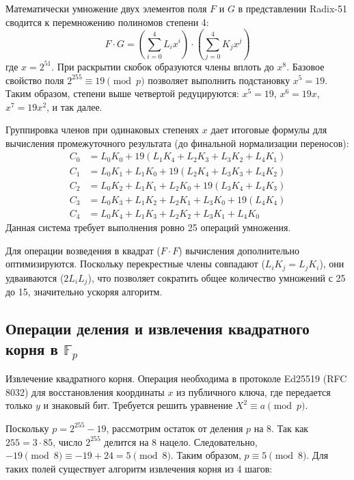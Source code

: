 Математически умножение двух элементов поля $F$ и $G$ в представлении Radix-51 сводится к перемножению полиномов степени 4:
\begin{equation}
    F \cdot G = \left( \sum_{i=0}^{4} L_i x^i \right) \cdot \left( \sum_{j=0}^{4} K_j x^j \right)
\end{equation}
где $x = 2^{51}$. При раскрытии скобок образуются члены вплоть до $x^8$. Базовое свойство поля $2^{255} \equiv 19 \pmod p$ позволяет выполнить подстановку $x^5 = 19$. Таким образом, степени выше четвертой редуцируются: $x^5 = 19$, $x^6 = 19x$, $x^7 = 19x^2$, и так далее. 

Группировка членов при одинаковых степенях $x$ дает итоговые формулы для вычисления промежуточного результата (до финальной нормализации переносов):
\begin{equation}
\begin{aligned}
    C_0 &= L_0 K_0 + 19(L_1 K_4 + L_2 K_3 + L_3 K_2 + L_4 K_1) \\
    C_1 &= L_0 K_1 + L_1 K_0 + 19(L_2 K_4 + L_3 K_3 + L_4 K_2) \\
    C_2 &= L_0 K_2 + L_1 K_1 + L_2 K_0 + 19(L_3 K_4 + L_4 K_3) \\
    C_3 &= L_0 K_3 + L_1 K_2 + L_2 K_1 + L_3 K_0 + 19(L_4 K_4) \\
    C_4 &= L_0 K_4 + L_1 K_3 + L_2 K_2 + L_3 K_1 + L_4 K_0
\end{aligned}
\end{equation}
Данная система требует выполнения ровно 25 операций умножения.

Для операции возведения в квадрат ($F \cdot F$) вычисления дополнительно оптимизируются. Поскольку перекрестные члены совпадают ($L_i K_j = L_j K_i$), они удваиваются ($2 L_i L_j$), что позволяет сократить общее количество умножений с 25 до 15, значительно ускоряя алгоритм.

\subsection{Операции деления и извлечения квадратного корня в $\mathbb{F}_p$}

Извлечение квадратного корня.
Операция необходима в протоколе Ed25519 (RFC 8032) для восстановления координаты $x$ из публичного ключа, где передается только $y$ и знаковый бит. Требуется решить уравнение $X^2 \equiv a \pmod p$.

Поскольку $p = 2^{255}-19$, рассмотрим остаток от деления $p$ на 8. Так как $255 = 3 \cdot 85$, число $2^{255}$ делится на 8 нацело. Следовательно, $-19 \pmod 8 \equiv -19 + 24 = 5 \pmod 8$. Таким образом, $p \equiv 5 \pmod 8$. Для таких полей существует алгоритм извлечения корня из 4 шагов:

